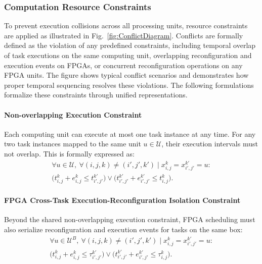\documentclass{IEEEtaes}
\begin{document}
\subsubsection{Computation Resource Constraints}To prevent execution collisions across all processing units, resource constraints are applied as illustrated in Fig.~\ref{fig:ConflictDiagram}. Conflicts are formally defined as the violation of any predefined constraints, including temporal overlap of task executions on the same computing unit, overlapping reconfiguration and execution events on FPGAs, or concurrent reconfiguration operations on any FPGA units. The figure shows typical conflict scenarios and demonstrates how proper temporal sequencing resolves these violations. The following formulations formalize these constraints through unified representations.

\paragraph{Non-overlapping Execution Constraint} Each computing unit can execute at most one task instance at any time. For any two task instances mapped to the same unit $u\in\mathcal{U}$, their execution intervals must not overlap. This is formally expressed as:
\begin{multline}
    \forall u \in \mathcal{U},\ \forall (i,j,k)\ne (i',j',k') \mid x_{i,j}^{k} = x_{i',j'}^{k'} = u: \\
 \big( t_{i,j}^{k} + e_{i,j}^{k} \leq t_{i',j'}^{k'} \big) \vee \big( t_{i',j'}^{k'} + e_{i',j'}^{k'} \leq t_{i,j}^{k} \big).
\label{equ:Computation Resource Constraints1}
\end{multline}

\paragraph{FPGA Cross-Task Execution-Reconfiguration Isolation Constraint}Beyond the shared non-overlapping execution constraint, FPGA scheduling must also serialize reconfiguration and execution events for tasks on the same box:
\begin{multline}
    \forall u \in \mathcal{U}^B,\ \forall (i,j,k)\ne(i',j',k') \mid x_{i,j}^{k} = x_{i',j'}^{k'} = u: \\
 \big( t_{i,j}^{k} + e_{i,j}^{k} \leq \tau_{i',j'}^{k'} \big) \vee \big( t_{i',j'}^{k'} + e_{i',j'}^{k'} \leq \tau_{i,j}^{k} \big).
\label{equ:Computation Resource Constraints2}
\end{multline}
\end{document}
